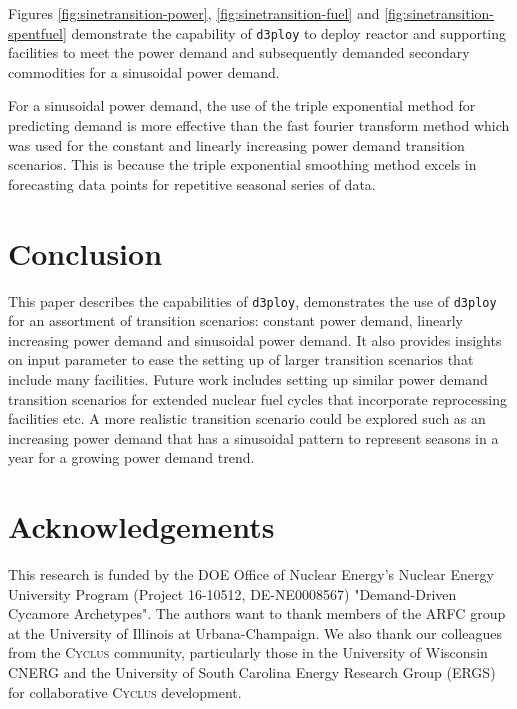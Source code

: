 \documentclass{anstrans}
\newcommand{\Cyclus}{\textsc{Cyclus}\xspace}%
\newcommand{\deploy}{\texttt{d3ploy}\xspace}%
\begin{document}
Figures \ref{fig:sinetransition-power}, \ref{fig:sinetransition-fuel}
and \ref{fig:sinetransition-spentfuel} demonstrate the capability 
of \deploy to deploy reactor and supporting facilities to meet the
power demand and subsequently demanded secondary commodities 
for a sinusoidal power demand. 

For a sinusoidal power demand, the use of the triple exponential method
for predicting demand is more effective than the 
fast fourier transform method which was used for the constant 
and linearly increasing power demand transition scenarios. 
This is because the triple exponential smoothing method excels in
forecasting data points for repetitive seasonal series of data.  

\section{Conclusion}
This paper describes the capabilities of \deploy, demonstrates 
the use of \deploy for an assortment of transition scenarios: 
constant power demand, linearly increasing power demand and
sinusoidal power demand.  
It also provides insights on input parameter to ease the
setting up of larger transition scenarios that include many facilities. 
Future work includes setting up similar power demand transition 
scenarios for extended nuclear fuel cycles that incorporate reprocessing 
facilities etc. 
A more realistic transition scenario could be explored such as an 
increasing power demand that has a sinusoidal pattern to represent 
seasons in a year for a growing power demand trend. 

\nopagebreak
\section{Acknowledgements}
This research is funded by the \gls{DOE} Office of 
Nuclear Energy's Nuclear Energy University Program 
(Project 16-10512, DE-NE0008567) 
"Demand-Driven Cycamore Archetypes". The authors want to thank 
members of the \gls{ARFC} group at the University of Illinois at 
Urbana-Champaign. 
We also thank our colleagues from the \Cyclus community, 
particularly those in the University of Wisconsin 
\gls{CNERG} and the University of South Carolina Energy Research 
Group (ERGS) for collaborative \Cyclus development.



\end{document}

